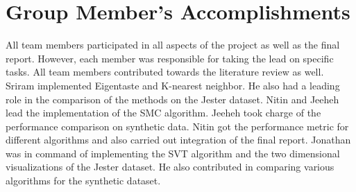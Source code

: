 \documentclass{article} %
\begin{document}
\section{Group Member's Accomplishments}

All team members participated in all aspects of the project as well as
the final report. However, each member was responsible for taking the
lead on specific tasks. All team members contributed towards the
literature review as well. Sriram implemented Eigentaste and K-nearest
neighbor. He also had a leading role in the comparison of the methods
on the Jester dataset. Nitin and Jeeheh lead the implementation of the
SMC algorithm. Jeeheh took charge of the performance comparison on
synthetic data. Nitin got the performance metric for different
algorithms and also carried out integration of the final report.
Jonathan was in command of implementing the SVT algorithm and the two
dimensional visualizations of the Jester dataset. He also contributed
in comparing various algorithms for the synthetic dataset.


\newpage




\end{document}
